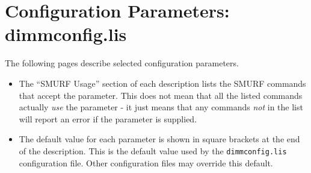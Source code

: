 \documentclass[twoside,11pt]{article}
\newcommand{\xlabel}[1]{}
\renewcommand{\_}{\texttt{\symbol{95}}}
\begin{document}
\section{\xlabel{par_full}Configuration Parameters: dimmconfig.lis}
\label{app:par_full}

The following pages describe selected configuration parameters.

\begin{itemize}
\item The ``SMURF Usage'' section of each description lists the SMURF
commands that accept the parameter. This does not mean that all the
listed commands actually \emph{use} the parameter - it just means that
any commands \emph{not} in the list will report an error if the parameter
is supplied.
\item The default value for each parameter is shown in square brackets at
the end of the description. This is the default value used by the
\texttt{dimmconfig.lis} configuration file. Other configuration
files may override this default.
\end{itemize}


\end{document}
